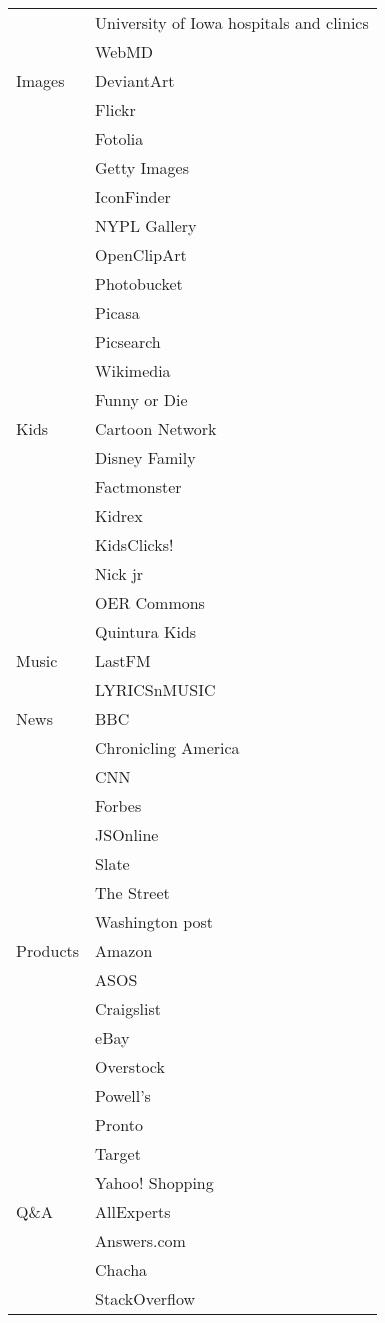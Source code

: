 \begin{center}
\begin{table}
\begin{tabular}{ | l | l | }
& 	University of Iowa hospitals and clinics	\\
& 	WebMD	\\
\hline
Images
& 	DeviantArt	\\
& 	Flickr	\\
& 	Fotolia	\\
& 	Getty Images	\\
& 	IconFinder	\\
& 	NYPL Gallery	\\
& 	OpenClipArt	\\
& 	Photobucket	\\
& 	Picasa	\\
& 	Picsearch	\\
& 	Wikimedia	\\
& 	Funny or Die	\\
\hline
Kids
& 	Cartoon Network	\\
& 	Disney Family	\\
& 	Factmonster	\\
& 	Kidrex	\\
& 	KidsClicks!	\\
& 	Nick jr	\\
& 	OER Commons	\\
& 	Quintura Kids	\\
\hline
Music
& 	LastFM	\\
& 	LYRICSnMUSIC	\\
\hline
News
& 	BBC	\\
& 	Chronicling America	\\
& 	CNN	\\
& 	Forbes	\\
& 	JSOnline	\\
& 	Slate	\\
& 	The Street	\\
& 	Washington post	\\
\hline
Products
& 	Amazon	\\
& 	ASOS	\\
& 	Craigslist	\\
& 	eBay	\\
& 	Overstock	\\
& 	Powell's	\\
& 	Pronto	\\
& 	Target	\\
& 	Yahoo! Shopping	\\
\hline
Q\&A
& 	AllExperts	\\
& 	Answers.com	\\
& 	Chacha	\\
& 	StackOverflow	\\

\end{tabular}
\end{table}
\end{center}
